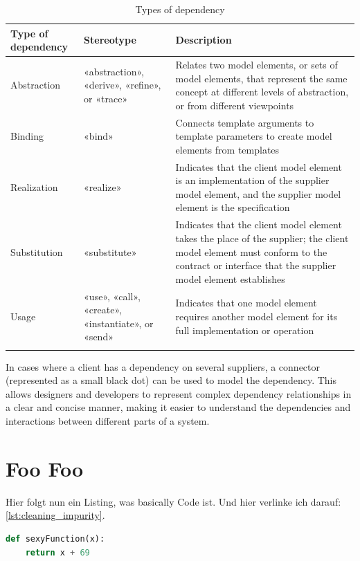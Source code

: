 \documentclass[
	12pt,
    a4paper,
    egregdoesnotlikesansseriftitles, %
    toc=chapterentrywithdots,
    oneside, openany,
    titlepage,
    parskip=half,
    headings=normal,  %
    listof=totoc,
    bibliography=totoc,
    index=totoc,
    captions=tableheading,  %
    listof=flat,
    numbers=noenddot, %
    final]
    {scrbook}
\begin{document}
\vspace{1em}
{\RaggedRight
\begin{longtable} {|p{3.5cm}|p{3.25cm}|p{6.5cm}|}
		\hline
		\textbf{Type of dependency} & \textbf{Stereotype} & \textbf{Description} \\
		\hline
		Abstraction & «abstraction», «derive», «refine», or «trace» & Relates two model elements, or sets of model elements, that represent the same concept at different levels of abstraction, or from different viewpoints  \\ 
		\hline
		Binding & 	«bind» & Connects template arguments to template parameters to create model elements from templates \\ 
		\hline
		Realization & «realize» & 	Indicates that the client model element is an implementation of the supplier model element, and the supplier model element is the specification \\ 
		\hline
		Substitution & «substitute» & Indicates that the client model element takes the place of the supplier; the client model element must conform to the contract or interface that the supplier model element establishes  \\ 
		\hline
		Usage & «use», «call», «create», «instantiate», or «send» & Indicates that one model element requires another model element for its full implementation or operation  \\ 
		\hline
	\caption[Types of dependencies]{Types of dependency \cite{ibm_dependencies}}
	\label{tab:functional_req}
\end{longtable}
}

In cases where a client has a dependency on several suppliers, a connector (represented as a small black dot) can be used to model the dependency. This allows designers and developers to represent complex dependency relationships in a clear and concise manner, making it easier to understand the dependencies and interactions between different parts of a system.


\section{Foo Foo}
Hier folgt nun ein Listing, was basically Code ist. Und hier verlinke ich darauf: \autoref{lst:cleaning_impurity}.

\begin{lstlisting}[language=Python,caption={Pythonbeispiel nach Albrecht et al. \cite{albrecht_blueprints_2020}},captionpos=b,label={lst:cleaning_impurity}]
def sexyFunction(x):
	return x + 69
\end{lstlisting}	
\end{document}
